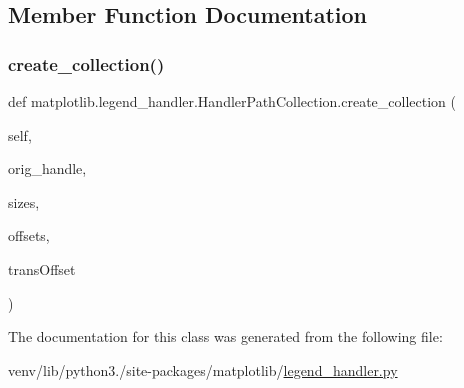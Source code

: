 \subsection{Member Function Documentation}
\mbox{\label{classmatplotlib_1_1legend__handler_1_1HandlerPathCollection_a5812b8b06d751a5b3ef77e98d9eda12f}} 
\subsubsection{\texorpdfstring{create\+\_\+collection()}{create\_collection()}}
{\footnotesize\ttfamily def matplotlib.\+legend\+\_\+handler.\+Handler\+Path\+Collection.\+create\+\_\+collection (\begin{DoxyParamCaption}\item[{}]{self,  }\item[{}]{orig\+\_\+handle,  }\item[{}]{sizes,  }\item[{}]{offsets,  }\item[{}]{trans\+Offset }\end{DoxyParamCaption})}



The documentation for this class was generated from the following file\+:\begin{DoxyCompactItemize}
\item 
venv/lib/python3./site-\/packages/matplotlib/\hyperlink{legend__handler_8py}{legend\+\_\+handler.\+py}\end{DoxyCompactItemize}
